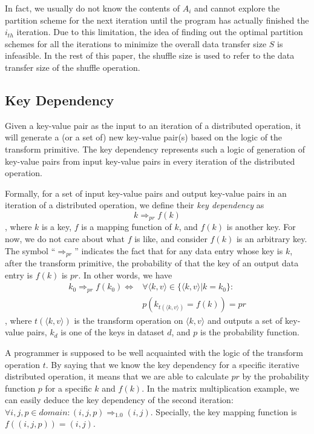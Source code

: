 \documentclass[10pt,journal,compsoc]{IEEEtran}
\begin{document}
In fact, we usually do not know the contents of $A_i$ and cannot explore the partition scheme 
for the next iteration until the program has actually finished the $i_{th}$ iteration. 
Due to this limitation, the idea of finding out the optimal partition schemes for all the iterations to minimize the overall data transfer size $S$ is infeasible. 
In the rest of this paper, the shuffle size is used to refer to the data transfer size of the shuffle operation. 

\subsection{Key Dependency}\label{section:dependency}
Given a key-value pair as the input to an iteration of a distributed operation,
it will generate a (or a set of) new key-value pair(s) based on the logic of the transform primitive. 
The key dependency
represents such a logic of generation of key-value pairs from input key-value pairs in every iteration
of the distributed operation. 

Formally, for a set of input key-value pairs and output key-value pairs 
in an iteration of a distributed operation, 
we define their \emph{key dependency} as 
\begin{equation}\label{eq:dependency}
k \Rightarrow_{pr} f(k)
\end{equation}
, where $k$ is a key, 
$f$ is a mapping function of $k$, 
and $f(k)$ is another key. 
For now, we do not care about what $f$ is like, and consider $f(k)$
is an arbitrary key. 
The symbol ``$\Rightarrow_{pr}$'' indicates the fact that 
for any data entry whose key is $k$, after the transform primitive, 
the probability of that the key of an output data entry is $f(k)$ is $pr$.
In other words, we have
\begin{equation*}\label{eq:dependencyDefine}
\begin{aligned}
k_0 \Rightarrow_{pr} f(k_0) \Leftrightarrow 
& \forall \langle k,v \rangle \in \{ \langle k,v \rangle | k = k_0\}: \\
& p(k_{t( \langle k,v \rangle)} = f(k)) = pr
\end{aligned}
\end{equation*}
, where $t(\langle k,v \rangle)$ is the transform operation on $\langle k,v \rangle$ and outputs 
a set of key-value pairs, $k_d$ is one of the keys in dataset $d$,
and $p$ is the probability function. 

A programmer is supposed to be well acquainted with the logic of the transform operation $t$. 
By saying that we know the key dependency for a specific iterative distributed operation,
it means that we are able to calculate $pr$ by the probability function 
$p$ for a specific $k$ and $f(k)$.
In the matrix multiplication example, we can easily deduce
the key dependency of the second iteration: 
$\forall i, j, p \in domain: (i, j, p) \Rightarrow_{1.0} (i, j)$.  
Specially, the key mapping function is $f((i, j, p)) = (i, j)$.
\end{document}
